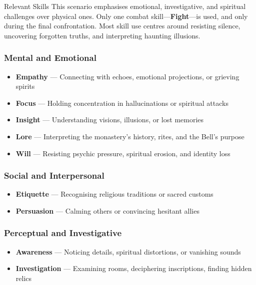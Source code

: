 \documentclass[nodeprecatedcode,bg=print]{dndbook/dndbook}
\begin{document}
\begin{WyrdSidebar}{Relevant Skills}
    This scenario emphasises emotional, investigative, and spiritual challenges over physical ones. Only one combat skill—\textbf{Fight}—is used, and only during the final confrontation. Most skill use centres around resisting silence, uncovering forgotten truths, and interpreting haunting illusions.
    
    \vspace{0.5\baselineskip}
    
    \subsubsection{Mental and Emotional}
    \begin{itemize}
        \item \textbf{Empathy} — Connecting with echoes, emotional projections, or grieving spirits
        \item \textbf{Focus} — Holding concentration in hallucinations or spiritual attacks
        \item \textbf{Insight} — Understanding visions, illusions, or lost memories
        \item \textbf{Lore} — Interpreting the monastery’s history, rites, and the Bell’s purpose
        \item \textbf{Will} — Resisting psychic pressure, spiritual erosion, and identity loss
    \end{itemize}
    
    \subsubsection{Social and Interpersonal}
    \begin{itemize}
        \item \textbf{Etiquette} — Recognising religious traditions or sacred customs
        \item \textbf{Persuasion} — Calming others or convincing hesitant allies
    \end{itemize}
    
    \subsubsection{Perceptual and Investigative}
    \begin{itemize}
        \item \textbf{Awareness} — Noticing details, spiritual distortions, or vanishing sounds
        \item \textbf{Investigation} — Examining rooms, deciphering inscriptions, finding hidden relics
    \end{itemize}
    

\end{WyrdSidebar}
\end{document}
